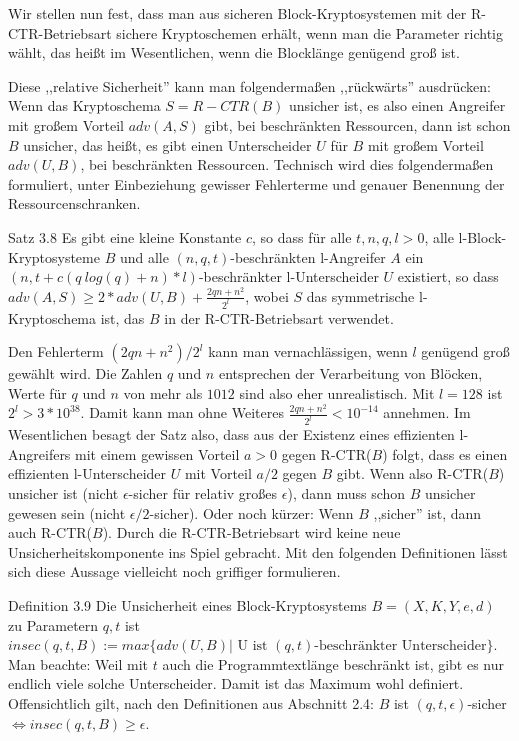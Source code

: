 \documentclass[a4paper]{article}
\begin{document}
\begin{multicols}{3}
    Wir stellen nun fest, dass man aus sicheren Block-Kryptosystemen mit der R-CTR-Betriebsart sichere Kryptoschemen erhält, wenn man die Parameter richtig wählt, das heißt im Wesentlichen, wenn die Blocklänge genügend groß ist.

    Diese ,,relative Sicherheit'' kann man folgendermaßen ,,rückwärts'' ausdrücken: Wenn das Kryptoschema $S=R-CTR(B)$ unsicher ist, es also einen Angreifer mit großem Vorteil $adv(A,S)$ gibt, bei beschränkten Ressourcen, dann ist schon $B$ unsicher, das heißt, es gibt einen Unterscheider $U$ für $B$ mit großem Vorteil $adv(U,B)$, bei beschränkten Ressourcen. Technisch wird dies folgendermaßen formuliert, unter Einbeziehung gewisser Fehlerterme und genauer Benennung der Ressourcenschranken.

    Satz 3.8 Es gibt eine kleine Konstante $c$, so dass für alle $t,n,q,l > 0$, alle l-Block-Kryptosysteme $B$ und alle $(n,q,t)$-beschränkten l-Angreifer $A$ ein $(n,t+c(q\ log(q) +n)*l)$-beschränkter l-Unterscheider $U$ existiert, so dass $adv(A,S)\geq 2 *adv(U,B) + \frac{2 qn+n^2}{2^l}$, wobei $S$ das symmetrische l-Kryptoschema ist, das $B$ in der R-CTR-Betriebsart verwendet.

    Den Fehlerterm $(2qn+n^2)/2^l$ kann man vernachlässigen, wenn $l$ genügend groß gewählt wird. Die Zahlen $q$ und $n$ entsprechen der Verarbeitung von Blöcken, Werte für $q$ und $n$ von mehr als $1012$ sind also eher unrealistisch. Mit $l=128$ ist $2^l> 3 * 10^{38}$. Damit kann man ohne Weiteres $\frac{2qn+n^2}{2^l} <10^{-14}$ annehmen. Im Wesentlichen besagt der Satz also, dass aus der Existenz eines effizienten l-Angreifers mit einem gewissen Vorteil $a>0$ gegen R-CTR($B$) folgt, dass es einen effizienten l-Unterscheider $U$ mit Vorteil $a/2$ gegen $B$ gibt. Wenn also R-CTR($B$) unsicher ist (nicht $\epsilon$-sicher für relativ großes $\epsilon$), dann muss schon $B$ unsicher gewesen sein (nicht $\epsilon/2$-sicher). Oder noch kürzer: Wenn $B$ ,,sicher'' ist, dann auch R-CTR($B$). Durch die R-CTR-Betriebsart wird keine neue Unsicherheitskomponente ins Spiel gebracht.
    Mit den folgenden Definitionen lässt sich diese Aussage vielleicht noch griffiger formulieren.

    Definition 3.9 Die Unsicherheit eines Block-Kryptosystems $B=(X,K,Y,e,d)$ zu Parametern $q,t$ ist $insec(q,t,B) := max\{adv(U,B)|\text{ U ist } (q,t) \text{-beschränkter Unterscheider}\}$.
    Man beachte: Weil mit $t$ auch die Programmtextlänge beschränkt ist, gibt es nur endlich viele solche Unterscheider. Damit ist das Maximum wohl definiert. Offensichtlich gilt, nach den Definitionen aus Abschnitt 2.4: $B$ ist $(q,t,\epsilon)$-sicher $\Leftrightarrow insec(q,t,B)\geq\epsilon$.


\end{multicols}
\end{document}
